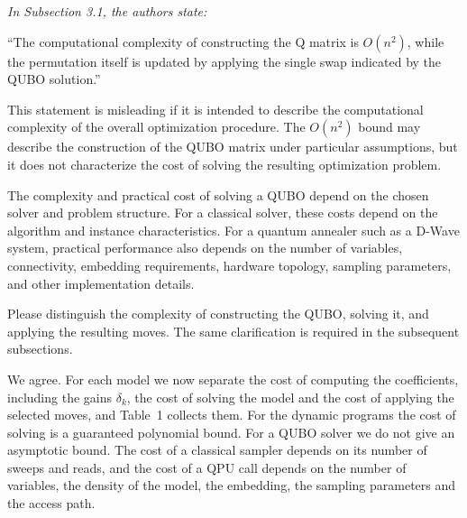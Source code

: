 \documentclass[12pt]{article}
\newenvironment{rc}[1]{\par\medskip\noindent\itshape\renewcommand{\emph}[1]{\textbf{##1}}\ignorespaces}{\par}
\newcommand{\answer}[1]{\par\smallskip\noindent #1\par}
\begin{document}
\begin{rc}{R2 3 --- Computational complexity}
In Subsection 3.1, the authors state:

``The computational complexity of constructing the Q matrix is $O(n^2)$, while the permutation itself is updated by applying the single swap indicated by the QUBO solution.''

This statement is misleading if it is intended to describe the computational complexity of the overall optimization procedure. The $O(n^2)$ bound may describe the construction of the QUBO matrix under particular assumptions, but it does not characterize the cost of solving the resulting optimization problem.

The complexity and practical cost of solving a QUBO depend on the chosen solver and problem structure. For a classical solver, these costs depend on the algorithm and instance characteristics. For a quantum annealer such as a D-Wave system, practical performance also depends on the number of variables, connectivity, embedding requirements, hardware topology, sampling parameters, and other implementation details.

Please distinguish the complexity of constructing the QUBO, solving it, and applying the resulting moves. The same clarification is required in the subsequent subsections.
\end{rc}
\answer{We agree. For each model we now separate the cost of computing the coefficients, including the gains $\delta_k$, the cost of solving the model and the cost of applying the selected moves, and Table~1 collects them. For the dynamic programs the cost of solving is a guaranteed polynomial bound. For a QUBO solver we do not give an asymptotic bound. The cost of a classical sampler depends on its number of sweeps and reads, and the cost of a QPU call depends on the number of variables, the density of the model, the embedding, the sampling parameters and the access path.}
\end{document}
